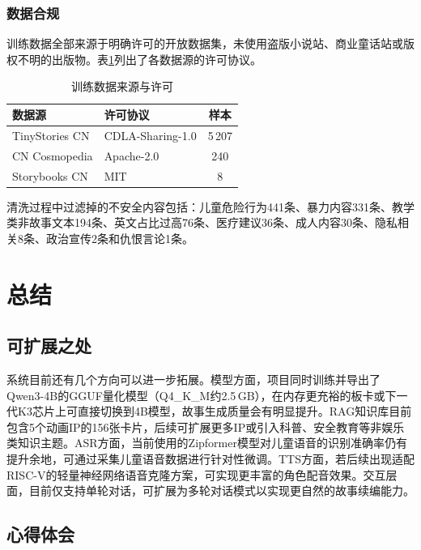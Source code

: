 \documentclass[lettersize,journal]{IEEEtran}
\begin{document}
\subsubsection{数据合规}

训练数据全部来源于明确许可的开放数据集，未使用盗版小说站、商业童话站或版权不明的出版物。表\ref{tab:data_license}列出了各数据源的许可协议。

\begin{table}[H]
    \centering
    \caption{训练数据来源与许可}
    \label{tab:data_license}
    \footnotesize
    \begin{tabular}{llc}
        \toprule
        \textbf{数据源} & \textbf{许可协议} & \textbf{样本} \\
        \midrule
        TinyStories CN & CDLA-Sharing-1.0 & 5\,207 \\
        CN Cosmopedia & Apache-2.0 & 240 \\
        Storybooks CN & MIT & 8 \\
        \bottomrule
    \end{tabular}
\end{table}

清洗过程中过滤掉的不安全内容包括：儿童危险行为441条、暴力内容331条、教学类非故事文本194条、英文占比过高76条、医疗建议36条、成人内容30条、隐私相关8条、政治宣传2条和仇恨言论1条。

\section{总结}
\label{sec:conclusion}

\subsection{可扩展之处}

系统目前还有几个方向可以进一步拓展。模型方面，项目同时训练并导出了Qwen3-4B的GGUF量化模型（Q4\_K\_M约2.5\,GB），在内存更充裕的板卡或下一代K3芯片上可直接切换到4B模型，故事生成质量会有明显提升。RAG知识库目前包含5个动画IP的156张卡片，后续可扩展更多IP或引入科普、安全教育等非娱乐类知识主题。ASR方面，当前使用的Zipformer模型对儿童语音的识别准确率仍有提升余地，可通过采集儿童语音数据进行针对性微调。TTS方面，若后续出现适配RISC-V的轻量神经网络语音克隆方案，可实现更丰富的角色配音效果。交互层面，目前仅支持单轮对话，可扩展为多轮对话模式以实现更自然的故事续编能力。

\subsection{心得体会}
\end{document}
